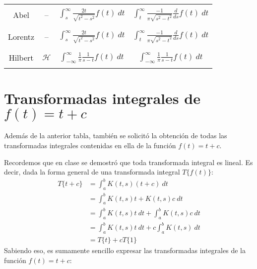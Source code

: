 \documentclass[12pt, a4paper]{article}
\begin{document}
\begin{center}
\begin{tabular}{c c c c}
        \midrule
        \\ Abel & – & \(\int_s^{\infty} \frac{2t}{\sqrt{t^2 - s^2}}f(t)\ dt\) & \(\int_t^{\infty} \frac{-1}{\pi\sqrt{s^2 - t^2}}\frac{d}{ds} f(t)\ dt\)\\ \\
        \midrule
        \\ Lorentz & – & \(\int_s^{\infty} \frac{2t}{\sqrt{t^2 - s^2}}f(t)\ dt\) & \(\int_t^{\infty} \frac{-1}{\pi\sqrt{s^2 - t^2}}\frac{d}{ds} f(t)\ dt\)\\ \\
        \midrule
        \\ Hilbert & \(\mathcal{H}\) & \(\int_{-\infty}^{\infty} \frac{1}{\pi}\frac{1}{s-t} f(t)\ dt\) & \(\int_{-\infty}^{\infty} \frac{1}{\pi} \frac{1}{s-t} f(t)\ dt\) \\ \\
        \bottomrule
    \end{tabular}
\end{center}

\section{Transformadas integrales de \texorpdfstring{\(f(t) = t+c\)}{f (t) = t + c}}

Además de la anterior tabla, también se solicitó la obtención de todas las transformadas integrales contenidas en ella de la función \(f(t) = t + c\).

Recordemos que en clase se demostró que toda transformada integral es lineal. Es decir, dada la forma general de una transformada integral \(T\{f(t)\}\):
\begin{align*}
    T\{t+c\} &= \int_{a}^{b} K(t,s) (t+c) \ dt \\
    &= \int_{a}^{b} K(t,s) t + K(t,s) c \ dt \\
    &= \int_{a}^{b} K(t,s) t \ dt + \int_{a}^{b} K(t,s) c \ dt \\
    &= \int_{a}^{b} K(t,s) t \ dt + c \int_{a}^{b} K(t,s) \ dt \\
    &= T\{t\} + c T\{1\}
\end{align*}
Sabiendo eso, es sumamente sencillo expresar las transformadas integrales de la función \(f(t) = t+c\):
\end{document}

